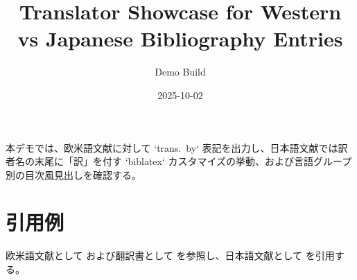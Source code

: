 \documentclass[a4paper]{jlreq}
\title{Translator Showcase for Western vs Japanese Bibliography Entries}
\author{Demo Build}
\date{2025-10-02}
\begin{document}
\maketitle

本デモでは、欧米語文献に対して `trans.~by` 表記を出力し、日本語文献では訳者名の末尾に「訳」を付す `biblatex` カスタマイズの挙動、および言語グループ別の目次風見出しを確認する。

\section*{引用例}
欧米語文献として \textcite{nowak2018} および翻訳書として \textcite{franklin2023} を参照し、日本語文献として \textcite{kant2022} を引用する。

\printbibliography
\end{document}
